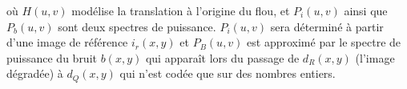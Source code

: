 \documentclass[10pt,a4paper]{article}
\begin{document}
où $H(u,v)$ modélise la translation à l'origine du flou, et $P_i(u,v)$ ainsi que $P_b(u,v)$ sont deux spectres de puissance. $P_i(u,v)$ sera déterminé à partir d'une image de référence $i_r(x,y)$ et $P_B(u,v)$ est approximé par le spectre de puissance du bruit $b(x,y)$ qui apparaît lors du passage de $d_R(x,y)$ (l'image dégradée) à $d_Q(x,y)$ qui n'est codée que sur des nombres entiers.
\end{document}
